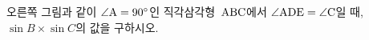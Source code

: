 \noindent\begin{minipage}[t]{0.58\linewidth}\vspace{0pt}\raggedright 오른쪽 그림과 같이 $\angle\mathrm{A}=90^\circ$인 직각삼각형~$\mathrm{ABC}$에서 $\angle\mathrm{ADE}=\angle\mathrm{C}$일 때, $\sin B\times\sin C$의 값을 구하시오.\end{minipage}\hfill\begin{minipage}[t]{0.4\linewidth}\vspace{0pt}\centering \resizebox{\ifdim\width>\linewidth\linewidth\else\width\fi}{!}{}\end{minipage}\par
